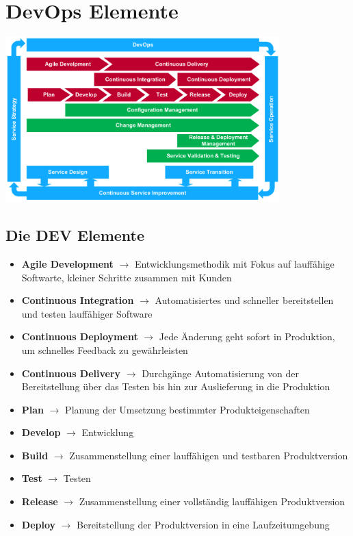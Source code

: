 \documentclass{report}
\newenvironment{Figure}
	{\par\medskip\noindent\minipage{\linewidth}}
	{\endminipage\par\medskip}
\theoremstyle{definition}
\theoremstyle{example}
\begin{document}
\section{DevOps Elemente}
\begin{Figure}
\centering
\includegraphics[width=400px]{img/DevOpsElemente.png}
	\label{fig:Die Relation zwischen Dev - Ops}
\end{Figure}

\subsection{Die DEV Elemente}
\begin{itemize}
	\item \textbf{Agile Development} $\rightarrow$ Entwicklungsmethodik mit Fokus auf lauffähige Softwarte, kleiner Schritte zusammen mit Kunden
	\item \textbf{Continuous Integration} $\rightarrow$ Automatisiertes und schneller bereitstellen und testen lauffähiger Software
	\item \textbf{Continuous Deployment} $\rightarrow$ Jede Änderung geht sofort in Produktion, um schnelles Feedback zu gewährleisten
	\item \textbf{Continuous Delivery} $\rightarrow$ Durchgänge Automatisierung von der Bereitstellung über das Testen bis hin zur Auslieferung in die Produktion
	\item \textbf{Plan} $\rightarrow$ Planung der Umsetzung bestimmter Produkteigenschaften
	\item \textbf{Develop} $\rightarrow$ Entwicklung
	\item \textbf{Build} $\rightarrow$ Zusammenstellung einer lauffähigen und testbaren Produktversion
	\item \textbf{Test} $\rightarrow$ Testen
	\item \textbf{Release} $\rightarrow$ Zusammenstellung einer vollständig lauffähigen Produktversion
	\item \textbf{Deploy} $\rightarrow$ Bereitstellung der Produktversion in eine Laufzeitumgebung

\end{itemize}
\end{document}

